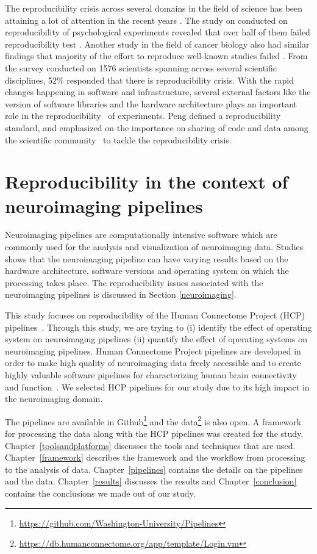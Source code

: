 The reproducibility crisis across several domains in the field of science has been attaining a lot of attention in the recent years \cite{aac4716,Begley2012,Button2013,Baker2016,Gla15}. The study on conducted on reproducibility of psychological experiments revealed that over half of them failed reproducibility test \cite{aac4716}. Another study in the field of cancer biology also had similar findings that majority of the effort to reproduce well-known studies failed \cite{Begley2012}. From the survey conducted on 1576 scientists spanning across several scientific disciplines, 52\% responded that there is reproducibility crisis.
With the rapid changes happening in software and infrastructure, several external factors like the version of software libraries and the hardware architecture plays an important role in the reproducibility~\cite{10.1371/journal.pone.0038234,Gla15} of experiments. Peng defined a reproducibility standard, and emphasized on the importance on sharing of code and data among the scientific community~\cite{Peng2011} to tackle the reproducibility  crisis.

\section{Reproducibility in the context of neuroimaging pipelines}
Neuroimaging pipelines are computationally intensive software which are commonly used for the analysis and visualization of neuroimaging data. Studies~\cite{10.1371/journal.pone.0038234,Gla15} shows that the neuroimaging pipeline can have varying results based on the hardware architecture, software versions and operating system on which the processing takes place. The reproducibility issues associated with the neuroimaging pipelines is discussed in Section \ref{neuroimaging}.

This study focuses on reproducibility of the Human Connectome Project (HCP) pipelines~\cite{Gla13}. Through this study, we are trying to (i) identify the effect of operating system on neuroimaging pipelines (ii) quantify the effect of operating systems on neuroimaging pipelines. Human Connectome Project pipelines are developed in order to make high quality of neuroimaging data freely accessible and to create highly valuable software pipelines for characterizing human brain connectivity and function~\cite{VanEssen2013}. We selected HCP pipelines for our study due to its high impact in the neuroimaging domain.

The pipelines are available in Github\footnote{\url{https://github.com/Washington-University/Pipelines}} and the data\footnote{\url{https://db.humanconnectome.org/app/template/Login.vm}} is also open. A framework for processing the data along with the HCP pipelines was created for the study. Chapter~\ref{toolsandplatforms} discusses the tools and techniques that are used. Chapter~\ref{framework} describes the framework and the workflow from processing to the analysis of data. Chapter~\ref{pipelines} contains the details on the pipelines and the data. Chapter~\ref{results} discusses the results and Chapter~\ref{conclusion} contains the conclusions we made out of our study.


